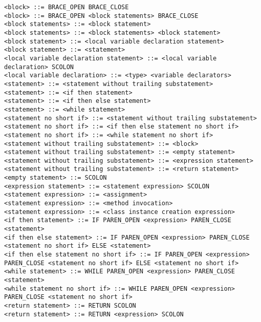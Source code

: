 \documentclass [a4paper,abstracton,titlepage]{scrartcl}
\begin{document}
\begin{lstlisting}<block> ::= BRACE_OPEN BRACE_CLOSE
<block> ::= BRACE_OPEN <block statements> BRACE_CLOSE
<block statements> ::= <block statement>
<block statements> ::= <block statements> <block statement>
<block statement> ::= <local variable declaration statement>
<block statement> ::= <statement>
<local variable declaration statement> ::= <local variable declaration> SCOLON
<local variable declaration> ::= <type> <variable declarators>
<statement> ::= <statement without trailing substatement>
<statement> ::= <if then statement>
<statement> ::= <if then else statement>
<statement> ::= <while statement>
<statement no short if> ::= <statement without trailing substatement>
<statement no short if> ::= <if then else statement no short if>
<statement no short if> ::= <while statement no short if>
<statement without trailing substatement> ::= <block>
<statement without trailing substatement> ::= <empty statement>
<statement without trailing substatement> ::= <expression statement>
<statement without trailing substatement> ::= <return statement>
<empty statement> ::= SCOLON
<expression statement> ::= <statement expression> SCOLON
<statement expression> ::= <assignment>
<statement expression> ::= <method invocation>
<statement expression> ::= <class instance creation expression>
<if then statement> ::= IF PAREN_OPEN <expression> PAREN_CLOSE <statement>
<if then else statement> ::= IF PAREN_OPEN <expression> PAREN_CLOSE <statement no short if> ELSE <statement>
<if then else statement no short if> ::= IF PAREN_OPEN <expression> PAREN_CLOSE <statement no short if> ELSE <statement no short if>
<while statement> ::= WHILE PAREN_OPEN <expression> PAREN_CLOSE <statement>
<while statement no short if> ::= WHILE PAREN_OPEN <expression> PAREN_CLOSE <statement no short if>
<return statement> ::= RETURN SCOLON
<return statement> ::= RETURN <expression> SCOLON\end{lstlisting}
\end{document}

